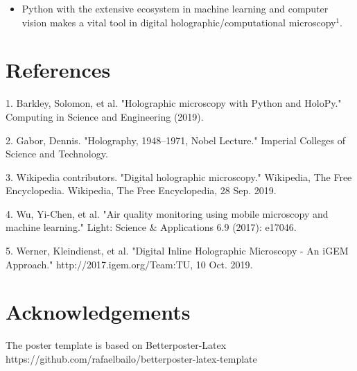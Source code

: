 \documentclass[a0paper,fleqn]{betterposter}
\begin{document}
{\begin{itemize}
\item Python with the extensive ecosystem in machine learning and computer vision makes a vital tool in digital holographic/computational microscopy$^{\text{1}}$. 

\end{itemize}

\section{References}

1. Barkley, Solomon, et al. "Holographic microscopy with Python and HoloPy." Computing in Science and Engineering (2019).

2. Gabor, Dennis. "Holography, 1948–1971, Nobel Lecture." Imperial Colleges of Science and Technology.

3. Wikipedia contributors. "Digital holographic microscopy." Wikipedia, The Free Encyclopedia. Wikipedia, The Free Encyclopedia, 28 Sep. 2019. 

4. Wu, Yi-Chen, et al. "Air quality monitoring using mobile microscopy and machine learning." Light: Science \& Applications 6.9 (2017): e17046.

5. Werner, Kleindienst, et al. "Digital Inline Holographic Microscopy - An iGEM Approach." http://2017.igem.org/Team:TU, 10 Oct. 2019. 


\section{Acknowledgements}
\setlength{\maincolumnmarginhorizontal}{0.1\paperheight}
{\fontsize{23}{35} \selectfont The poster template is based on Betterposter-Latex \\ https://github.com/rafaelbailo/betterposter-latex-template}
    


}
\end{document}
